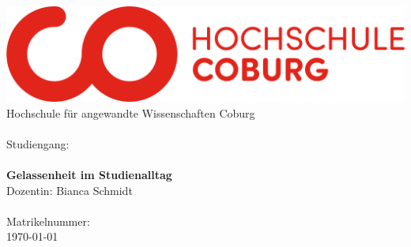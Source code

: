 \begin{titlepage}
  \centering
  \includegraphics[width=14.9cm]{framework/Logo_HS_Coburg}\\ [1cm]
  \fontsize{18}{20}\selectfont Hochschule für angewandte Wissenschaften Coburg\\[.1cm]
  \Fakultaet \\[1.5cm]%
  Studiengang: \Studiengang\\[1.5cm]
  
  \\ [1.0cm]

  {\selectfont\bfseries Gelassenheit im Studienalltag }\\    
   
    Dozentin: Bianca Schmidt \\ [1.5cm]
    {\selectfont\bfseries
\Autorname}\\

Matrikelnummer: 	
 \Matrikelnummer\\ [0.5cm]
  \fontsize{16}{18}\selectfont
  \today\\

\end{titlepage}